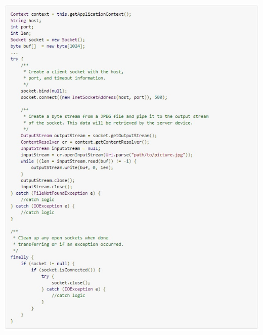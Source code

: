\begin{center}
\includegraphics[width=1\textwidth]{imgs/client.jpg}
\label{client_img}%
\end{center}

\clearpage{\pagestyle{empty}\cleardoublepage}